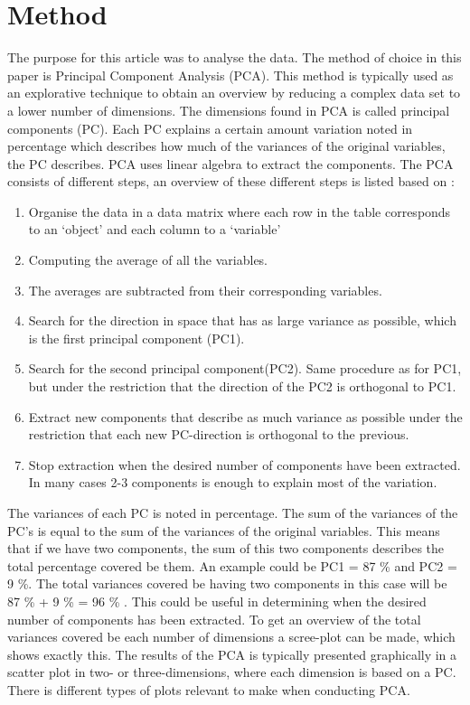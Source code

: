 \section*{Method}
\label{Method}
%
The purpose for this article was to analyse the data. The method of choice in this paper is Principal Component Analysis (PCA). This method is typically used as an explorative technique to obtain an overview by reducing a complex data set to a lower number of dimensions. The dimensions found in PCA is called principal components (PC). Each PC explains a certain amount variation noted in percentage which describes how much of the variances of the original variables, the PC describes.\blankline
%
PCA uses linear algebra to extract the components. The PCA consists of different steps, an overview of these different steps is listed based on \textcite[pp. 211-213]{Naes2010}:

\begin{enumerate}
	\item Organise the data in a data matrix where each row in the table corresponds to an ‘object’ and each column to a ‘variable’
	\item Computing the average of all the variables. 
	\item The averages are subtracted from their corresponding variables. 
	\item Search for the direction in space that has as large variance as possible, which is the first principal component (PC1).
	\item Search for the second principal component(PC2). Same procedure as for PC1, but under the restriction that the direction of the PC2 is orthogonal to PC1. 
	\item Extract new components that describe as much variance as possible under the restriction that each new PC-direction is orthogonal to the previous.
	\item Stop extraction when the desired number of components have been extracted. In many cases 2-3 components is enough to explain most of the variation. 
\end{enumerate}
\blankline
%
The variances of each PC is noted in percentage.
The sum of the variances of the PC's is equal to the sum of the variances of the original variables. This means that if we have two components, the sum of this two components describes the total percentage covered be them. An example could be PC1 = 87 \% and PC2 = 9 \%. The total variances covered be having two components in this case will be 87 \% + 9 \% = 96 \% \parencite[p. 213]{Naes2010}. This could be useful in determining when the desired number of components has been extracted. To get an overview of the total variances covered be each number of dimensions a scree-plot can be made, which shows exactly this. \blankline
%
The results of the PCA is typically presented graphically in a scatter plot in two- or three-dimensions, where each dimension is based on a PC. There is different types of plots relevant to make when conducting PCA. 

